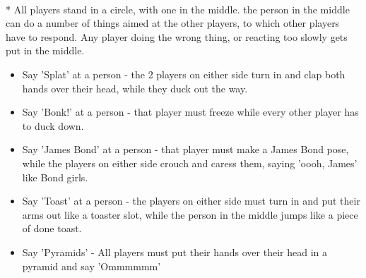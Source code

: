 \begin{minipage}{\textwidth}
\\*
All players stand in a circle, with one in the middle.  the person in the middle can do a number of things aimed at the other players, to which other players have to respond.  Any player doing the wrong thing, or reacting too slowly gets put in the middle.

\begin{itemize}
\item Say 'Splat' at a person - the 2 players on either side turn in and clap both hands over their head, while they duck out the way.

\item Say 'Bonk!' at a person - that player must freeze while every other player has to duck down.

\item Say 'James Bond' at a person - that player must make a James Bond pose, while the players on either side crouch and caress them, saying 'oooh, James' like Bond girls.

\item Say 'Toast' at a person - the players on either side must turn in and put their arms out like a toaster slot, while the person in the middle jumps like a piece of done toast.

\item Say 'Pyramids' - All players must put their hands over their head in a pyramid and say 'Ommmmmm'
\end{itemize}

\end{minipage}    \vfill
